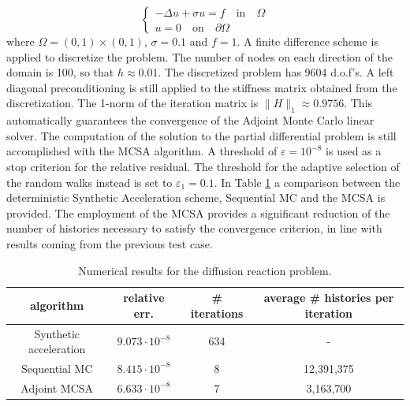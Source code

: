 \documentclass[a4paper,10pt]{article}
\begin{document}
\begin{equation}
\begin{cases}
 -\Delta u +\sigma u= f \quad \text{in}\quad \Omega \\
 u=0\quad \text{on} \quad \partial\Omega
 \end{cases}
\end{equation}
where $\Omega=(0,1)\times (0,1)$, $\sigma=0.1$ and $f=1$.
A finite difference scheme is applied to discretize the problem.
The number of nodes
on each direction of the domain is 100, so that $h\approx 0.01$. The
discretized problem has 9604 d.o.f's. A left
diagonal preconditioning is still applied to
the stiffness matrix obtained from the discretization. The 1-norm of the
iteration matrix is $\lVert H\rVert_1\approx 0.9756$. This automatically
guarantees the convergence of the Adjoint Monte Carlo linear solver. The
computation of the solution to the partial differential problem is still
accomplished with the MCSA algorithm. A threshold of $\varepsilon =10^{-8}$ is
used as a stop criterion for the relative residual. The threshold
for the adaptive selection of the random walks instead is set
to $\varepsilon_1=0.1$.
In Table \ref{DR_results} a comparison between the deterministic Synthetic
Acceleration
scheme, Sequential MC and the MCSA is provided.
The employment of the MCSA provides a significant reduction of the number of
histories necessary to satisfy the convergence criterion, in line with results
coming from the previous test case.

\begin{table}[!h]
\centering
\hspace*{-0.8cm}
\begin{tabular}{|c|c|c|c|}
\hline
algorithm & relative err.& \# iterations & average \# histories per iteration\\
\hline
 Synthetic acceleration & $9.073\cdot 10^{-8}$ & 634 & - \\
\hline
 Sequential MC & $8.415 \cdot 10^{-8}$ &  8 & 12,391,375\\
 \hline
 Adjoint MCSA & $6.633 \cdot 10^{-8}$ &  7 & 3,163,700\\
\hline
\end{tabular}
\caption{Numerical results for the diffusion reaction problem.}
\label{DR_results}
\end{table}
\end{document}
